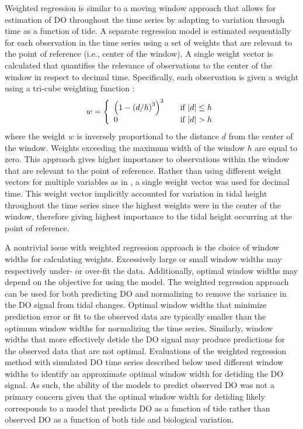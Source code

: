 Weighted regression is similar to a moving window approach that allows for estimation of \ac{DO} throughout the time series by adapting to variation through time as a function of tide. A separate regression model is estimated sequentially for each observation in the time series using a set of weights that are relevant to the point of reference (i.e., center of the window).  A single weight vector is calculated that quantifies the relevance of observations to the center of the window in respect to decimal time.  Specifically,  each observation is given a weight using a tri-cube weighting function \citep{Hirsch10}:
\begin{equation}
w= \left\{ 
  \begin{array}{l l}
    \left(1-\left(d/h\right)^3\right)^3 & \quad \textrm{if } |d| \leq h \\
    0 & \quad \textrm{if } |d| > h 
  \end{array} \right.
\end{equation}
where the weight $w$ is inversely proportional to the distance $d$ from the center of the window.  Weights exceeding the maximum width of the window $h$ are equal to zero.  This approach gives higher importance to observations within the window that are relevant to the point of reference.  Rather than using different weight vectors for multiple variables as in \cite{Hirsch10}, a single weight vector was used for decimal time.  This weight vector implicitly accounted for variation in tidal height throughout the time series since the highest weights were in the center of the window, therefore giving highest importance to the tidal height occurring at the point of reference. 

A nontrivial issue with weighted regression approach is the choice of window widths for calculating weights.  Excessively large or small window widths may respectively under- or over-fit the data.  Additionally, optimal window widths may depend on the objective for using the model.  The weighted regression approach can be used for both predicting \ac{DO} and normalizing to remove the variance in the \ac{DO} signal from tidal changes.  Optimal window widths that minimize prediction error or fit to the observed data are typically smaller than the optimum window widths for normalizing the time series.  Similarly, window widths that more effectively detide the \ac{DO} signal may produce predictions for the observed data that are not optimal.  Evaluations of the weighted regression method with simulated \ac{DO} time series described below used different window widths to identify an approximate optimal window width for detiding the \ac{DO} signal.  As such, the ability of the models to predict observed \ac{DO} was not a primary concern given that the optimal window width for detiding likely corresponds to a model that predicts \ac{DO} as a function of tide rather than observed \ac{DO} as a function of both tide and biological variation.  

